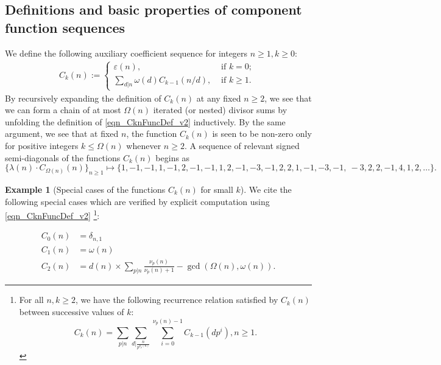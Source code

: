 \documentclass[11pt,reqno,a4letter]{article}
\numberwithin{figure}{section}
\numberwithin{table}{section}
\newcommand{\seqnum}[1]{\href{http://oeis.org/#1}{\color{ProcessBlue}{\underline{#1}}}}
\theoremstyle{plain}
\numberwithin{theorem}{section}
\theoremstyle{definition}
\newtheorem{example}[theorem]{Example}
\newcommand{\NBRef}[1]{}
\begin{document}
\subsection{Definitions and basic properties of component function sequences} 

We define the following auxiliary coefficient sequence for integers $n \geq 1, k \geq 0$: 
\begin{align} 
\label{eqn_CknFuncDef_v2} 
C_k(n) := \begin{cases} 
     \varepsilon(n), & \text{ if $k = 0$; } \\ 
     \sum\limits_{d|n} \omega(d) C_{k-1}(n/d), & \text{ if $k \geq 1$. } 
     \end{cases} 
\end{align} 
By recursively expanding the definition of $C_k(n)$ 
at any fixed $n \geq 2$, we see that 
we can form a chain of at most $\Omega(n)$ iterated (or nested) divisor sums by 
unfolding the definition of \eqref{eqn_CknFuncDef_v2} inductively. 
By the same argument, we see that at fixed $n$, the function 
$C_k(n)$ is seen to be non-zero only for positive integers 
$k \leq \Omega(n)$ whenever $n \geq 2$. 
A sequence of relevant signed semi-diagonals of the functions $C_k(n)$ begins as 
\cite[\seqnum{A008480}]{OEIS} 
\[
\{\lambda(n) \cdot C_{\Omega(n)}(n) \}_{n \geq 1} \mapsto \{
     1, -1, -1, 1, -1, 2, -1, -1, 1, 2, -1, -3, -1, 2, 2, 1, -1, -3, -1, \
     -3, 2, 2, -1, 4, 1, 2, \ldots \}. 
\]

\begin{example}[Special cases of the functions $C_k(n)$ for small $k$] 
\label{example_SpCase_Ckn} 
We cite the following special cases which are verified by 
explicit computation using \eqref{eqn_CknFuncDef_v2} 
\cite[\seqnum{A066922}]{OEIS}\footnote{ 
     For all $n,k \geq 2$, we have the following recurrence 
     relation satisfied by $C_k(n)$ between successive values of $k$: 
     \begin{equation*}
     C_k(n) = \sum_{p|n} \sum_{d\rvert\frac{n}{p^{\nu_p(n)}}} \sum_{i=0}^{\nu_p(n)-1} 
          C_{k-1}\left(dp^i\right), n \geq 1. 
     \end{equation*}
}: 
\NBRef{A07-2020-04-26} 
\begin{align*} 
C_0(n) & = \delta_{n,1} \\ 
C_1(n) & = \omega(n) \\ 
C_2(n) & = d(n) \times \sum_{p|n} \frac{\nu_p(n)}{\nu_p(n)+1} - \gcd\left(\Omega(n), \omega(n)\right). 
\end{align*} 
\end{example} 
\end{document}
